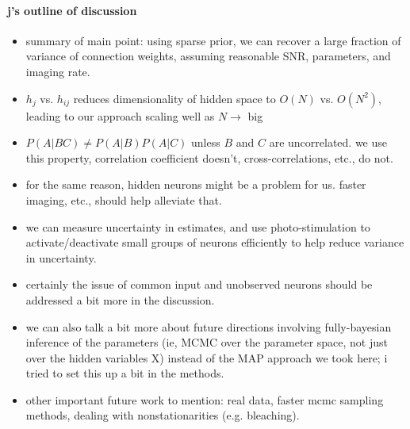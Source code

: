 \paragraph{j's outline of discussion}

\begin{itemize}
\item summary of main point: using sparse prior, we can recover a large fraction of variance of connection weights, assuming reasonable SNR, parameters, and imaging rate.

\item $h_j$ vs. $h_{ij}$ reduces dimensionality of hidden space to $O(N)$ vs. $O(N^2)$, leading to our approach scaling well as $N \rightarrow$ big

\item $P(A|BC)\neq P(A|B)P(A|C)$ unless $B$ and $C$ are uncorrelated.  we use this property, correlation coefficient doesn't, cross-correlations, etc., do not.

\item for the same reason, hidden neurons might be a problem for us.  faster imaging, etc., should help alleviate that.

\item we can measure uncertainty in estimates, and use photo-stimulation to activate/deactivate small groups of neurons efficiently to help reduce variance in uncertainty.

\item certainly the issue of common input and unobserved neurons should be addressed a bit more in the discussion.  

\item we can also talk a bit more about future directions involving fully-bayesian inference of the parameters (ie, MCMC over the parameter space, not just over the hidden variables X) instead of the MAP approach we took here; i tried to set this up a bit in the methods.  

\item other important future work to mention: real data, faster mcmc sampling methods, dealing with nonstationarities (e.g. bleaching).
\end{itemize}

